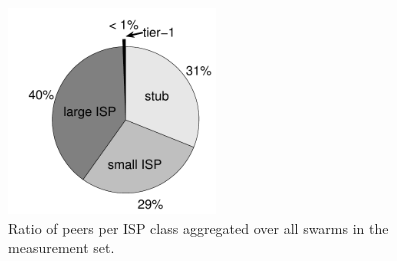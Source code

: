 \begin{figure}[bt]
\centering
	\includegraphics[width=0.49\textwidth]{aslevel/p2p/methodology/figs/npeers_perTier}
 	\caption{Ratio of peers per ISP class aggregated over all swarms in the measurement set.}
 	\label{fig:npeers_perTier}
\end{figure}



